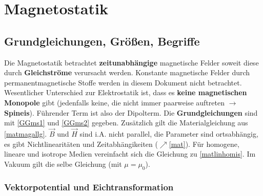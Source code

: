 \chapter{Magnetostatik}\label{ms}
 \section{Grundgleichungen, Größen, Begriffe}
		  Die Magnetostatik betrachtet \textbf{zeitunabhängige} magnetische Felder soweit diese durch \textbf{Gleichströme} verursacht werden. Konstante magnetische Felder durch permanentmagnetische Stoffe werden in diesem Dokument nicht betrachtet.
		   Wesentlicher Unterschied zur Elektrostatik ist, dass es \textbf{keine magnetischen Monopole} gibt (jedenfalls keine, die nicht immer paarweise auftreten $\to$ \textbf{Spineis}). Führender Term ist also der Dipolterm.
		   Die \textbf{Grundgleichungen} sind mit \ref{GGms1} und \ref{GGms2} gegeben.
	 		Zusätzlich gilt die Materialgleichung aus \ref{matmagallg}. $\vec{B}$ und $\vec{H}$ sind i.A. nicht parallel, die Parameter sind ortsabhängig, es gibt Nichtlinearitäten und Zeitabhängikeiten ($\nearrow$\ref{mat}). Für homogene, lineare und isotrope Medien vereinfacht sich die Gleichung zu \ref{matlinhomis}. Im Vakuum gilt die selbe Gleichung (mit $\mu=\mu_0$).
	\subsection{Vektorpotential und Eichtransformation}
